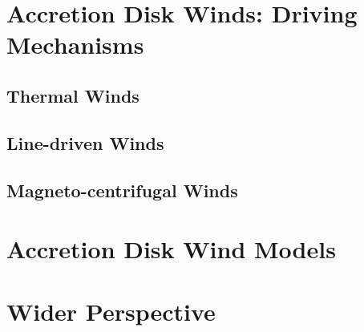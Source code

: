\section{Accretion Disk Winds: Driving Mechanisms}

\subsection{Thermal Winds}

\subsection{Line-driven Winds}

\subsection{Magneto-centrifugal Winds}



\section{Accretion Disk Wind Models}



\section{Wider Perspective}

